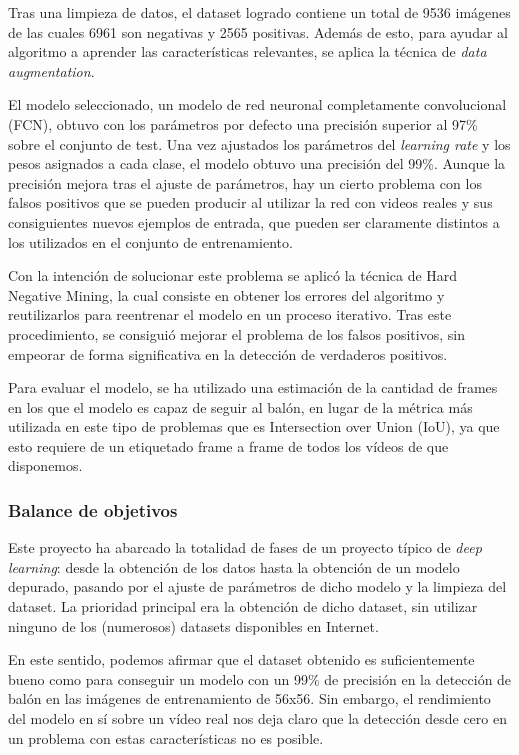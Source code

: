 Tras una limpieza de datos, el dataset logrado contiene un total de 9536 imágenes de las cuales 6961 son negativas y 2565 positivas. Además de esto, para ayudar al algoritmo a aprender las características relevantes, se aplica la técnica de \textit{data augmentation}.

El modelo seleccionado, un modelo de red neuronal completamente convolucional (FCN), obtuvo con los parámetros por defecto una precisión superior al 97\% sobre el conjunto de test. Una vez ajustados los parámetros del \textit{learning rate} y los pesos asignados a cada clase, el modelo obtuvo una precisión del 99\%. Aunque la precisión mejora tras el ajuste de parámetros, hay un cierto problema con los falsos positivos que se pueden producir al utilizar la red con videos reales y sus consiguientes nuevos ejemplos de entrada, que pueden ser claramente distintos a los utilizados en el conjunto de entrenamiento.

Con la intención de solucionar este problema se aplicó la técnica de Hard Negative Mining, la cual consiste en obtener los errores del algoritmo y reutilizarlos para reentrenar el modelo en un proceso iterativo. Tras este procedimiento, se consiguió mejorar el problema de los falsos positivos, sin empeorar de forma significativa en la detección de verdaderos positivos.

Para evaluar el modelo, se ha utilizado una estimación de la cantidad de frames en los que el modelo es capaz de seguir al balón, en lugar de la métrica más utilizada en este tipo de problemas que es Intersection over Union (IoU), ya que esto requiere de un etiquetado frame a frame de todos los vídeos de que disponemos. 




\subsubsection*{Balance de objetivos}

Este proyecto ha abarcado la totalidad de fases de un proyecto típico de \textit{deep learning}: desde la obtención de los datos hasta la obtención de un modelo depurado, pasando por el ajuste de parámetros de dicho modelo y la limpieza del dataset. La prioridad principal era la obtención de dicho dataset, sin utilizar ninguno de los (numerosos) datasets disponibles en Internet.

En este sentido, podemos afirmar que el dataset obtenido es suficientemente bueno como para conseguir un modelo con un 99\% de precisión en la detección de balón en las imágenes de entrenamiento de 56x56. Sin embargo, el rendimiento del modelo en sí sobre un vídeo real nos deja claro que la detección desde cero en un problema con estas características no es posible.

